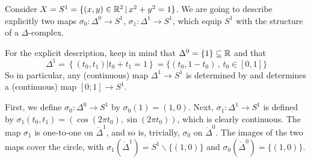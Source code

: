 \documentclass[11pt,a4paper]{report}
\begin{document}
		     
		     \begin{Ex}\label{circle_1}
        
        Consider   $ X = S^1 = \{ (x,y) \in \mathbb{R}^2 \, | \, x^2 + y^2 = 1 \} $. 
        We are going to describe  explicitly two  maps $\sigma_0: \Delta^0 \rightarrow S^1$, $\sigma_1:\Delta^1\to S^1$, which equip
        $S^1$ with the structure of a $\Delta$-complex. 
        
        For the explicit description, keep in mind that $\Delta^0=\{1\}\subseteq \mathbb{R}$ and that 
         \[ \Delta^1 = \left\{(t_0,t_1)\left| t_0+t_1=1\right.   \right\}  = \{ (t_0, 1-t_0) \, , \, t_0 \in [0, 1] \} \]
         So in particular, any (continuous) map
          $\Delta^1\to S^1$ is determined by and determines  a (continuous) map $[0;1]\to S^1$.
        
	
              
             
	      
	      
	            First, we define $\sigma_0: \Delta^0 \rightarrow S^1 $ by  $\sigma_0(1) = (1, 0)$. Next,
		       $\sigma_1: \Delta^1 \rightarrow S^1 $ is defined by  $\sigma_1(t_0,t_1) = (\cos(2\pi t_0), \sin(2\pi t_0))$, 
		       which is clearly continuous.
		       The map $\sigma_1$ is one-to-one on $\mathring{\Delta}^1$, and so is, trivially, $\sigma_0$ on $\mathring{\Delta}^0$.  The images of the two
		       maps cover the circle, with $\sigma_1\left( \mathring{\Delta}^1\right)=S^1\backslash\{(1,0)\}$ and
		        $\sigma_0\left( \mathring{\Delta}^0\right)=\{(1,0)\}$.
              

\end{Ex}
\end{document}
